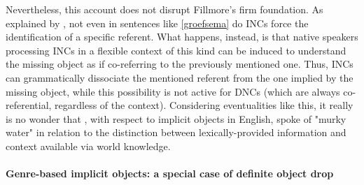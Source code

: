 Nevertheless, this account does not disrupt Fillmore's firm foundation. As explained by \textcite[527]{Eu2018}, not even in sentences like \ref{groefsema} do INCs force the identification of a specific referent. What happens, instead, is that native speakers processing INCs in a flexible context of this kind can be induced to understand the missing object as if co-referring to the previously mentioned one. Thus, INCs can grammatically dissociate the mentioned referent from the one implied by the missing object, while this possibility is not active for DNCs (which are always co-referential, regardless of the context). Considering eventualities like this, it really is no wonder that \textcite[110]{Cote1996}, with respect to implicit objects in English, spoke of "murky water" in relation to the distinction between lexically-provided information and context available via world knowledge.



\paragraph{Genre-based implicit objects: a special case of definite object drop} 

